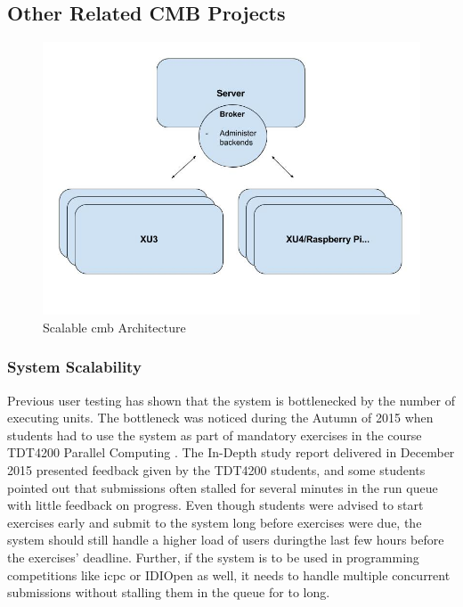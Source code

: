 \subsection{Other Related CMB Projects}
\label{subsec:related-proj}
\begin{figure}[ct!]
  \includegraphics[width=1.0\textwidth]{figs/cmb_scale_arch.jpg}
  \caption[Scalable \gls{cmb} Architecture]{Scalable \gls{cmb} Architecture}
  \label{fig:cmb-scale-arch}
\end{figure}

\subsubsection{System Scalability}
Previous user testing has shown that the system is bottlenecked by the number of executing units. The bottleneck was noticed during the Autumn of 2015 when students had to use the system as part of mandatory exercises in the course TDT4200 Parallel Computing \cite{TDT4200}. The In-Depth study report delivered in December 2015 presented feedback given by the TDT4200 students, and some students pointed out that submissions often stalled for several minutes in the run queue with little feedback on progress. Even though students were advised to start exercises early and submit to the system long before exercises were due, the system should still handle a higher load of users duringthe last few hours before the exercises' deadline. Further, if the system is to be used in programming competitions like \gls{icpc} \cite{ICPC} or IDIOpen \cite{IDIOPEN} as well, it needs to handle multiple concurrent submissions without stalling them in the queue for to long. \\

